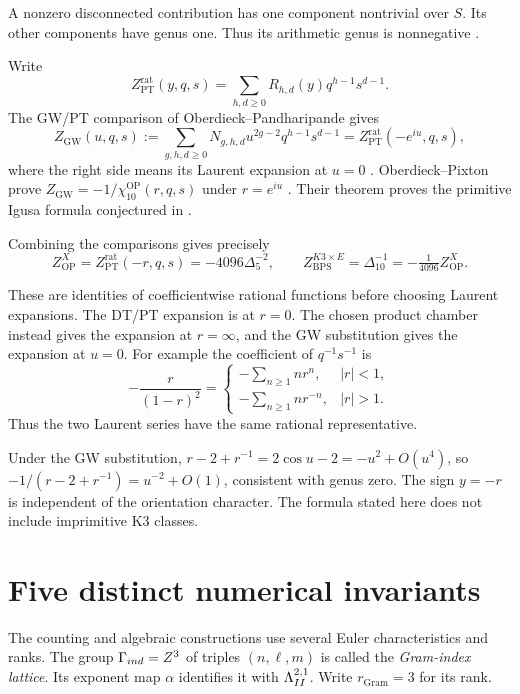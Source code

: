 A nonzero disconnected contribution has one component nontrivial
over \(S\). Its other components have genus one. Thus its arithmetic
genus is nonnegative \cite[\S1.2]{OPand}.

Write
\[
 Z_{\mathrm{PT}}^{\mathrm{rat}}(y,q,s)
 =\sum_{h,d\geq0}R_{h,d}(y)q^{h-1}s^{d-1}.
\]
The GW/PT comparison of Oberdieck--Pandharipande gives
\[
 Z_{\mathrm{GW}}(u,q,s):=\sum_{g,h,d\geq0}
 N_{g,h,d}u^{2g-2}q^{h-1}s^{d-1}
 =Z_{\mathrm{PT}}^{\mathrm{rat}}(-e^{iu},q,s),
\]
where the right side means its Laurent expansion at \(u=0\)
\cite[Proposition 5]{OPand}. Oberdieck--Pixton prove
\(Z_{\mathrm{GW}}=-1/\chi_{10}^{\mathrm{OP}}(r,q,s)\) under
\(r=e^{iu}\) \cite[Theorem 1]{OB}. Their theorem proves the
primitive Igusa formula conjectured in \cite{OPand}.

Combining the comparisons gives precisely
\[
 Z^X_{\mathrm{OP}}=Z_{\mathrm{PT}}^{\mathrm{rat}}(-r,q,s)
 =-4096\Delta_5^{-2},\qquad
 Z^{K3\times E}_{\mathrm{BPS}}=\Delta_{10}^{-1}
 =-\tfrac1{4096}Z^X_{\mathrm{OP}}.
\]

These are identities of coefficientwise rational functions before
choosing Laurent expansions. The DT/PT expansion is at \(r=0\).
The chosen product chamber instead gives the expansion at
\(r=\infty\), and the GW substitution gives the expansion at
\(u=0\). For example the coefficient of \(q^{-1}s^{-1}\) is
\[
 -\frac{r}{(1-r)^2}
 =\begin{cases}
 -\sum_{n\geq1}n r^n,& |r|<1,\\
 -\sum_{n\geq1}n r^{-n},& |r|>1.
 \end{cases}
\]
Thus the two Laurent series have the same rational representative.

Under the GW substitution,
\(r-2+r^{-1}=2\cos u-2=-u^2+O(u^4)\), so
\(-1/(r-2+r^{-1})=u^{-2}+O(1)\), consistent with genus zero.
The sign \(y=-r\) is independent of the orientation character.
The formula stated here does not include imprimitive K3 classes.

\section{Five distinct numerical invariants}

The counting and algebraic constructions use several Euler
characteristics and ranks. The group $\Gamma_{ind}=Z^3$
of triples $(n,\ell,m)$ is called the \emph{Gram-index lattice}.
Its exponent map $\alpha$ identifies it with $\Lambda^{2,1}_{II}$.
Write $r_{\mathrm{Gram}}=3$ for its rank.

